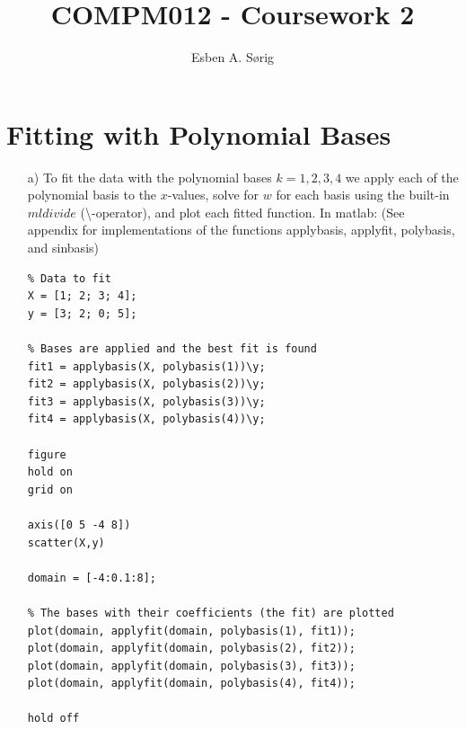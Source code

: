 \documentclass[11pt]{article}
\begin{document}
\lstset{language=Matlab}

\title{COMPM012 - Coursework 2}
\author{Esben A. S\o rig}

\maketitle

\section{Fitting with Polynomial Bases}
\begin{itemize}
    \item[a)]
        To fit the data with the polynomial bases $k=1,2,3,4$ we apply each of the polynomial basis to the $x$-values, solve for $w$ for each basis using the built-in $mldivide$ (\textbackslash -operator), and plot each fitted function. In matlab: (See appendix for implementations of the functions applybasis, applyfit, polybasis, and sinbasis)
        \begin{lstlisting}
% Data to fit
X = [1; 2; 3; 4];
y = [3; 2; 0; 5];

% Bases are applied and the best fit is found
fit1 = applybasis(X, polybasis(1))\y;
fit2 = applybasis(X, polybasis(2))\y;
fit3 = applybasis(X, polybasis(3))\y;
fit4 = applybasis(X, polybasis(4))\y;

figure 
hold on
grid on

axis([0 5 -4 8])
scatter(X,y)

domain = [-4:0.1:8];

% The bases with their coefficients (the fit) are plotted
plot(domain, applyfit(domain, polybasis(1), fit1));
plot(domain, applyfit(domain, polybasis(2), fit2));
plot(domain, applyfit(domain, polybasis(3), fit3));
plot(domain, applyfit(domain, polybasis(4), fit4));

hold off
        \end{lstlisting}
        

\end{itemize}
\end{document}
